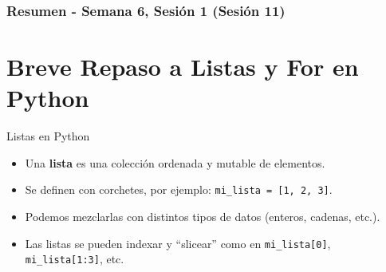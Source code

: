 \documentclass[10pt]{beamer}
\begin{document}
\myfront{}

\begin{frame}
  \titlepage
\end{frame}

\begin{frame}
  \frametitle{Resumen - Semana 6, Sesión 1 (Sesión 11)}
  \tableofcontents
\end{frame}


\section{Breve Repaso a Listas y For en Python}

\begin{frame}{Listas en Python}
  \begin{itemize}
    \item Una \textbf{lista} es una colección ordenada y mutable de elementos.
    \item Se definen con corchetes, por ejemplo: \texttt{mi\_lista = [1, 2, 3]}.
    \item Podemos mezclarlas con distintos tipos de datos (enteros, cadenas, etc.).
    \item Las listas se pueden indexar y “slicear” como en \texttt{mi\_lista[0]}, \texttt{mi\_lista[1:3]}, etc.
  \end{itemize}
\end{frame}
\end{document}
